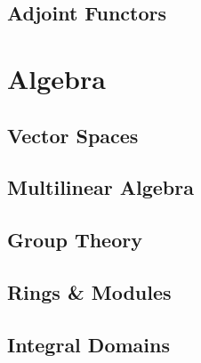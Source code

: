 

\chapter{Adjoint Functors}



\part{Algebra}

\chapter{Vector Spaces}








% 

\chapter{Multilinear Algebra}







\chapter{Group Theory}







\chapter{Rings \& Modules}





\chapter{Integral Domains}



